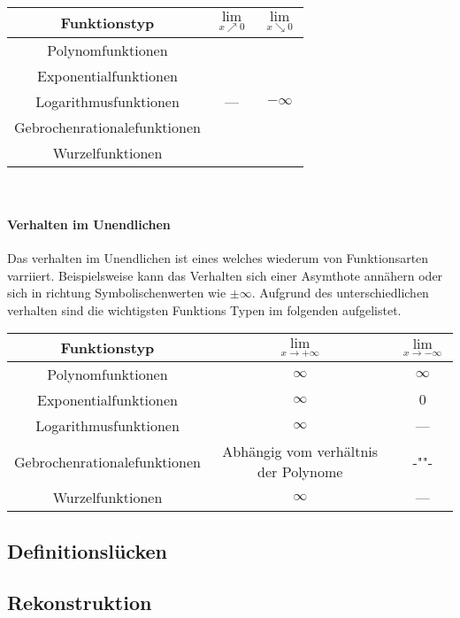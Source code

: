 \documentclass{article}
\begin{document}
		\begin{tabular}{|c|c|c|}
			\hline 
			Funktionstyp & $\lim\limits_{x \nearrow 0}$& $\lim\limits_{x \searrow 0}$ \\
			\hline
			Polynomfunktionen & & \\
			\hline
			Exponentialfunktionen & & \\
			\hline
			Logarithmusfunktionen & --- & $- \infty$ \\
			\hline
			Gebrochenrationalefunktionen & & \\
			\hline
			Wurzelfunktionen & & \\ 
			\hline
		\end{tabular}\\
	
		
		\paragraph{Verhalten im Unendlichen \\}\label{Verhalten Im unendlichen} 
			
			Das verhalten im Unendlichen ist eines welches wiederum von Funktionsarten varriiert. Beispielsweise kann das Verhalten sich einer Asymthote annähern oder sich in richtung Symbolischenwerten wie $ \pm \infty$. Aufgrund des unterschiedlichen verhalten sind die wichtigsten Funktions Typen im folgenden aufgelistet.
		
			\begin{tabular}{|c|c|c|}
				\hline 
				Funktionstyp & $\lim\limits_{x \rightarrow + \infty}$& $\lim\limits_{x \rightarrow - \infty}$ \\
				\hline
				Polynomfunktionen & $\infty$ & $\infty$ \\
				\hline
				Exponentialfunktionen & $\infty$ & $0$ \\
				\hline
				Logarithmusfunktionen & $\infty$ & --- \\
				\hline
				Gebrochenrationalefunktionen & Abhängig vom verhältnis der Polynome & -""- \\
				\hline
				Wurzelfunktionen & $\infty$ & --- \\ 
				\hline
			\end{tabular}
			
	\subsection{Definitionslücken}\label{Definitionslücke}
	
	\subsection{Rekonstruktion}\label{Rekonstruktion}
\end{document}
